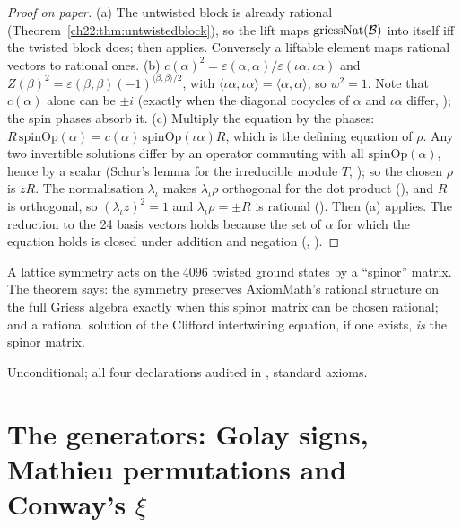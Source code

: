 \begin{proof}[Proof on paper]
(a) The untwisted block is already rational (Theorem~\ref{ch22:thm:untwistedblock}), so the lift maps
$\mathrm{griessNat}(\mathcal{B})$ into itself iff the twisted block does; then 
applies.  Conversely a liftable element maps rational vectors to rational ones.
(b) $c(\alpha)^2=\varepsilon(\alpha,\alpha)/\varepsilon(\iota\alpha,\iota\alpha)$ and
$Z(\beta)^2=\varepsilon(\beta,\beta)(-1)^{\langle\beta,\beta\rangle/2}$, with $\langle\iota\alpha,\iota\alpha\rangle=
\langle\alpha,\alpha\rangle$; so $w^2=1$.  Note that $c(\alpha)$ alone can be $\pm i$ (exactly when the diagonal cocycles of
$\alpha$ and $\iota\alpha$ differ, ); the spin phases absorb it.
(c) Multiply the equation by the phases: $R\,\mathrm{spinOp}(\alpha)=c(\alpha)\,\mathrm{spinOp}(\iota\alpha)R$, which is the
defining equation of $\rho$.  Any two invertible solutions differ by an operator commuting with all $\mathrm{spinOp}(\alpha)$,
hence by a scalar (Schur's lemma for the irreducible module $T$, ); so the chosen
$\rho$ is $z R$.  The normalisation $\lambda_\iota$ makes $\lambda_\iota\rho$ orthogonal for the dot product (), and
$R$ is orthogonal, so $(\lambda_\iota z)^2=1$ and $\lambda_\iota\rho=\pm R$ is rational ().  Then (a) applies.  The
reduction to the 24 basis vectors holds because the set of $\alpha$ for which the equation holds is closed under
addition and negation (, ).
\end{proof}
\begin{physics}
A lattice symmetry acts on the $4096$ twisted ground states by a ``spinor'' matrix.  The theorem says: the symmetry
preserves AxiomMath's rational structure on the full Griess algebra exactly when this spinor matrix can be chosen
rational; and a rational solution of the Clifford intertwining equation, if one exists, \emph{is} the spinor matrix.
\end{physics}
\begin{status}Unconditional; all four declarations audited in ,
standard axioms.\end{status}

\section{The generators: Golay signs, Mathieu permutations and Conway's \texorpdfstring{$\xi$}{xi}}\label{ch22:sec:generators}

